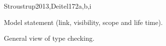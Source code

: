 \begin{syllabus}
\begin{unit}{\PLBasicTypeSystems}{}{Stroustrup2013,Deitel17}{2}{a,b,i}
    \begin{topics}
        \item \PLBasicTypeSystemsTopicA        
        \item Model statement (link, visibility, scope and life time).
        \item General view of type checking.
    \end{topics}
    \begin{learningoutcomes}
        \item \PLBasicTypeSystemsLOForBoth [\Familiarity] 
        \item \PLBasicTypeSystemsLOForA [\Familiarity] 
        \item \PLBasicTypeSystemsLODescribeExamples [\Familiarity] 
        \item \PLBasicTypeSystemsLOForMultiple [\Usage] 
        \item \PLBasicTypeSystemsLOGiveAnThat [\Familiarity] 
        \item \PLBasicTypeSystemsLOUseTypes [\Usage] 
        \item \PLBasicTypeSystemsLOExplainHowDefine [\Familiarity] 
        \item \PLBasicTypeSystemsLOWriteDown [\Usage] 
        \item \PLBasicTypeSystemsLOExplainWhyType [\Familiarity] 
        \item \PLBasicTypeSystemsLODefineAndPieces [\Usage] 
        \item \PLBasicTypeSystemsLODiscussTheGenerics [\Familiarity] 
        \item \PLBasicTypeSystemsLOExplainMultiple [\Familiarity] 
    \end{learningoutcomes}
\end{unit}


\end{syllabus}
